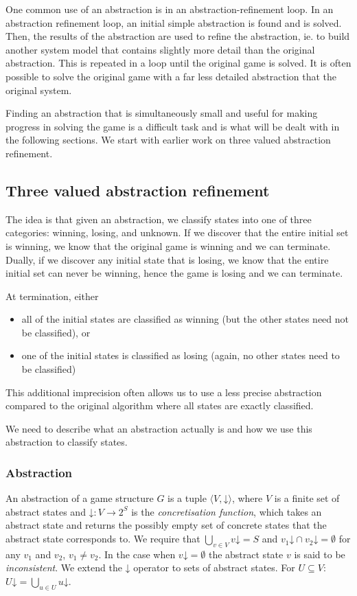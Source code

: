\documentclass{article}
\newcommand{\concrete}[1]{#1\mathord{\downarrow}}
\begin{document}
One common use of an abstraction is in an abstraction-refinement loop. In an abstraction refinement loop, an initial simple abstraction is found and is solved. Then, the results of the abstraction are used to refine the abstraction, ie. to build another system model that contains slightly more detail than the original abstraction. This is repeated in a loop until the original game is solved. It is often possible to solve the original game with a far less detailed abstraction that the original system. 

Finding an abstraction that is simultaneously small and useful for making progress in solving the game is a difficult task and is what will be dealt with in the following sections. We start with earlier work on three valued abstraction refinement. 

\subsection{Three valued abstraction refinement}

The idea is that given an abstraction, we classify states into one of three categories: winning, losing, and unknown. If we discover that the entire initial set is winning, we know that the original game is winning and we can terminate. Dually, if we discover any initial state that is losing, we know that the entire initial set can never be winning, hence the game is losing and we can terminate. 

At termination, either 
\begin{itemize}
\item all of the initial states are classified as winning (but the other states need not be classified), or
\item one of the initial states is classified as losing (again, no other states need to be classified)
\end{itemize}

This additional imprecision often allows us to use a less precise abstraction compared to the original algorithm where all states are exactly classified. 

We need to describe what an abstraction actually is and how we use this abstraction to classify states. 

\subsubsection{Abstraction}

An abstraction of a game structure $G$ is a tuple $\langle V, 
\concrete{}\rangle$, where $V$ is a finite set of abstract states 
and $\concrete{} : V \rightarrow 2^S $ is the \emph{concretisation 
function}, which takes an abstract state and returns the possibly 
empty set of concrete states that the abstract state corresponds 
to.  We require that $\bigcup_{v\in V}\concrete{v} = S$ and         
$\concrete{v_1}\cap \concrete{v_2} = \emptyset$ for any $v_1$ and 
$v_2$, $v_1 \neq v_2$. In the case when $\concrete{v} = \emptyset$ 
the abstract state $v$ is said to be \emph{inconsistent}.  We 
extend the $\concrete{}$ operator to sets of abstract states.  For 
$U\subseteq V$: $\concrete{U} = \bigcup_{u\in U}\concrete{u}$.
\end{document}
